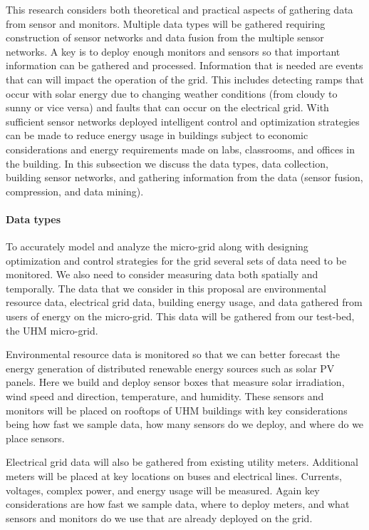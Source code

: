 This research considers both theoretical and practical aspects of gathering
data from sensor and monitors.  Multiple data types will be gathered
requiring construction of sensor networks and data fusion from the multiple
sensor networks.  A key is to deploy enough monitors and sensors so that
important information can be gathered and processed.  Information that is
needed are events that can will impact the operation of the grid.  This
includes detecting ramps that occur with solar energy due to changing
weather conditions (from cloudy to sunny or vice versa) and faults that can
occur on the electrical grid.  With sufficient sensor networks deployed
intelligent control and optimization strategies can be made to reduce
energy usage in buildings subject to economic considerations and energy
requirements made on labs, classrooms, and offices in the building.  In
this subsection we discuss the data types, data collection, building sensor
networks, and gathering information from the data (sensor fusion,
compression, and data mining).
 
\paragraph{Data types}
 
To accurately model and analyze the micro-grid along with designing
optimization and control strategies for the grid several sets of data need
to be monitored.  We also need to consider measuring data both spatially
and temporally.  The data that we consider in this proposal are
environmental resource data, electrical grid data, building energy usage,
and data gathered from users of energy on the micro-grid.  This data will
be gathered from our test-bed, the UHM micro-grid.
 
Environmental resource data is monitored so that we can better forecast the
energy generation of distributed renewable energy sources such as solar PV
panels.  Here we build and deploy sensor boxes that measure solar
irradiation, wind speed and direction, temperature, and humidity.  These
sensors and monitors will be placed on rooftops of UHM buildings with key
considerations being how fast we sample data, how many sensors do we
deploy, and where do we place sensors.
 
Electrical grid data will also be gathered from existing utility meters.
Additional meters will be placed at key locations on buses and electrical
lines.  Currents, voltages, complex power, and energy usage will be
measured.  Again key considerations are how fast we sample data, where to
deploy meters, and what sensors and monitors do we use that are already
deployed on the grid.
 
